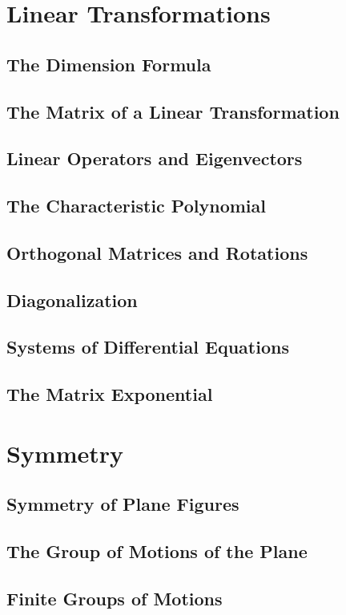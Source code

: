 \documentclass[12pt]{book}
\begin{document}
\chapter{Linear Transformations}

\section{The Dimension Formula}
\section{The Matrix of a Linear Transformation}
\section{Linear Operators and Eigenvectors}
\section{The Characteristic Polynomial}
\section{Orthogonal Matrices and Rotations}
\section{Diagonalization}
\section{Systems of Differential Equations}
\section{The Matrix Exponential}




\chapter{Symmetry}

\section{Symmetry of Plane Figures}
\section{The Group of Motions of the Plane}
\section{Finite Groups of Motions}
\end{document}
